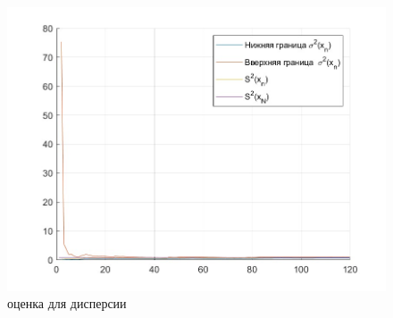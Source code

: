 \begin{figure}[h]
	\includegraphics[width=1\linewidth]{inc/img/g2}
	\caption{оценка для дисперсии}
\end{figure}

